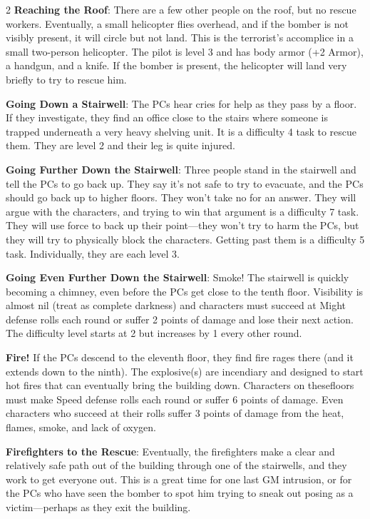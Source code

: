 \begin{multicols}{2}
\textbf{Reaching the Roof}: There are a few other people on the roof, but no rescue workers. Eventually,
a small helicopter flies overhead, and if the bomber is not visibly present, it will circle but not land. This is the terrorist’s accomplice in a small two-person helicopter. The pilot is level 3 and has body armor (+2 Armor), a handgun, and a knife. If the bomber is present, the helicopter will land very briefly to try to rescue him.

\textbf{Going Down a Stairwell}: The PCs hear cries for help as they pass by a floor. If they investigate, they find an office close to the stairs where someone is trapped underneath a very heavy shelving unit. It is a difficulty 4 task to rescue them. They are level 2 and their leg is quite injured.

\textbf{Going Further Down the Stairwell}: Three people stand in the stairwell and tell the PCs to go back up. They say it’s not safe to try to evacuate, and the PCs should go back up to higher floors. They won’t take no for an answer. They will argue with the characters, and trying to win that argument is a difficulty 7 task. They will use force to back up their point—they won’t try to harm the PCs, but they will try to physically block the characters. Getting past them is a difficulty 5 task. Individually, they are each level 3.

\textbf{Going Even Further Down the Stairwell}: Smoke! The stairwell is quickly becoming a chimney, even before the PCs get close to the tenth floor. Visibility is almost nil (treat as complete darkness) and characters must succeed at Might defense rolls each round or suffer 2 points of damage and lose their next action. The difficulty level starts at 2 but increases by 1 every other round.

\textbf{Fire!} If the PCs descend to the eleventh floor, they find fire rages there (and it extends down to the ninth). The explosive(s) are incendiary and designed to start hot fires that can eventually bring the building down. Characters on thesefloors must make Speed defense rolls each round or suffer 6 points of damage. Even characters who succeed at their rolls suffer 3 points of damage from the heat, flames, smoke, and lack of oxygen.

\textbf{Firefighters to the Rescue}: Eventually, the firefighters make a clear and relatively safe path out of the building through one of the stairwells, and they work to get everyone out. This is a great time for one last GM intrusion, or for the PCs who have seen the bomber to spot him trying to sneak out posing as a victim—perhaps as they exit the building.


\end{multicols}
